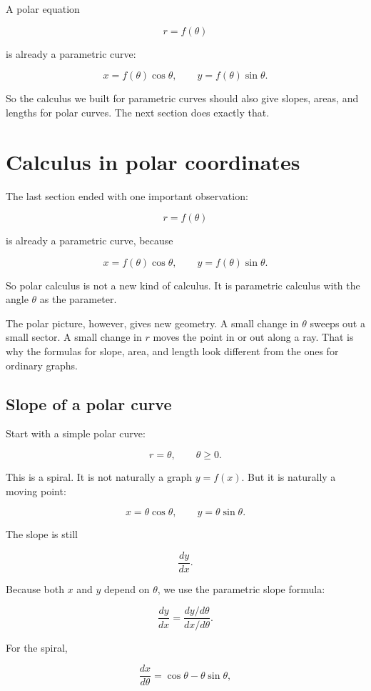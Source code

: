A polar equation

\[
r=f(\theta)
\]

is already a parametric curve:

\[
x=f(\theta)\cos\theta,
\qquad
y=f(\theta)\sin\theta.
\]

So the calculus we built for parametric curves should also give slopes, areas, and lengths
for polar curves.  The next section does exactly that.
\section{Calculus in polar coordinates}
\label{sec:calculus-polar-coordinates}

The last section ended with one important observation:

\[
r=f(\theta)
\]

is already a parametric curve, because

\[
x=f(\theta)\cos\theta,
\qquad
y=f(\theta)\sin\theta.
\]

So polar calculus is not a new kind of calculus.  It is parametric calculus with the angle
\(\theta\) as the parameter.

The polar picture, however, gives new geometry.  A small change in \(\theta\) sweeps
out a small sector.  A small change in \(r\) moves the point in or out along a ray.  That
is why the formulas for slope, area, and length look different from the ones for ordinary
graphs.

\subsection{Slope of a polar curve}
\label{subsec:slope-polar-curve}

Start with a simple polar curve:

\[
r=\theta,
\qquad
\theta\ge0.
\]

This is a spiral.  It is not naturally a graph \(y=f(x)\).  But it is naturally a moving point:

\[
x=\theta\cos\theta,
\qquad
y=\theta\sin\theta.
\]

The slope is still

\[
\frac{dy}{dx}.
\]

Because both \(x\) and \(y\) depend on \(\theta\), we use the parametric slope formula:

\[
\frac{dy}{dx}
=
\frac{dy/d\theta}{dx/d\theta}.
\]

For the spiral,

\[
\frac{dx}{d\theta}
=
\cos\theta-\theta\sin\theta,
\]

